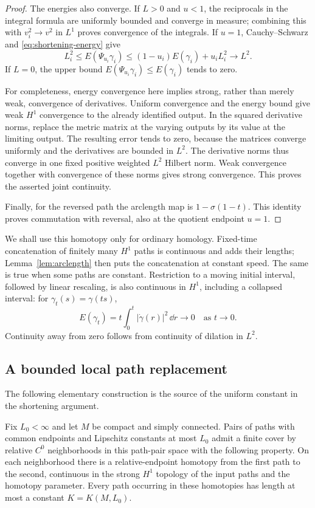 \begin{proof}
The energies also converge.  If $L>0$ and $u<1$, the reciprocals in the
integral formula are uniformly bounded and converge in measure; combining
this with $v_i^2\to v^2$ in $L^1$ proves convergence of the integrals.
If $u=1$, Cauchy--Schwarz and \eqref{eq:shortening-energy} give
\[
 L_i^2\le E(\Psi_{u_i}\gamma_i)
 \le(1-u_i)E(\gamma_i)+u_iL_i^2\longrightarrow L^2.
\]
If $L=0$, the upper bound $E(\Psi_{u_i}\gamma_i)\le E(\gamma_i)$ tends
to zero.

For completeness, energy convergence here implies strong, rather than
merely weak, convergence of derivatives.  Uniform convergence and the
energy bound give weak $H^1$ convergence to the already identified output.
In the squared derivative norms, replace the metric matrix at the varying
outputs by its value at the limiting output.  The resulting error tends
to zero, because the matrices converge uniformly and the derivatives are
bounded in $L^2$.  The derivative norms thus converge in one fixed positive
weighted $L^2$ Hilbert norm.  Weak convergence together with convergence of
these norms gives strong convergence.  This proves the asserted joint
continuity.

Finally, for the reversed path the arclength map is
$1-\sigma(1-t)$.  This identity proves commutation with reversal, also
at the quotient endpoint $u=1$.
\end{proof}

We shall use this homotopy only for ordinary homology.  Fixed-time
concatenation of finitely many $H^1$ paths is continuous and adds their
lengths; Lemma~\ref{lem:arclength} then puts the concatenation at constant
speed.  The same is true when some paths are constant.  Restriction to a
moving initial interval, followed by linear rescaling, is also continuous
in $H^1$, including a collapsed interval: for $\gamma_t(s)=\gamma(ts)$,
\[
 E(\gamma_t)=t\int_0^t|\dot\gamma(r)|^2\,\dd r\longrightarrow0
 \quad\text{as }t\longrightarrow0.
\]
Continuity away from zero follows from continuity of dilation in $L^2$.

\subsection{A bounded local path replacement}

The following elementary construction is the source of the uniform
constant in the shortening argument.

\begin{lemma}\label{lem:shortening-recipes}
Fix $L_0<\infty$ and let $M$ be compact and simply connected.  Pairs of
paths with common endpoints and Lipschitz constants at most $L_0$ admit a
finite cover by relative $C^0$ neighborhoods in this path-pair space
with the following property.  On each
neighborhood there is a relative-endpoint homotopy from the first path to
the second, continuous in the strong $H^1$ topology of the input paths and
the homotopy parameter.  Every path occurring in these homotopies has
length at most a constant $K=K(M,L_0)$.
\end{lemma}

